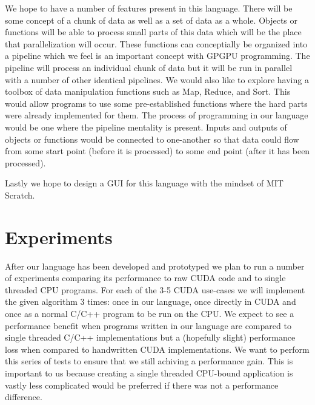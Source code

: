 \documentclass{article}
\begin{document}
We hope to have a number of features present in this language. There will be some concept of a chunk of data as well as a set of data as a whole. Objects or functions will be able to process small parts of this data which will be the place that parallelization will occur. These functions can conceptially be organized into a pipeline which we feel is an important concept with GPGPU programming. The pipeline will process an individual chunk of data but it will be run in parallel with a number of other identical pipelines. We would also like to explore having a toolbox of data manipulation functions such as Map, Reduce, and Sort. This would allow programs to use some pre-established functions where the hard parts were already implemented for them. The process of programming in our language would be one where the pipeline mentality is present. Inputs and outputs of objects or functions would be connected to one-another so that data could flow from some start point (before it is processed) to some end point (after it has been processed).

Lastly we hope to design a GUI for this language with the mindset of MIT Scratch. 

\section{Experiments}
After our language has been developed and prototyped we plan to run a number of experiments comparing its performance to raw CUDA code and to single threaded CPU programs. For each of the 3-5 CUDA use-cases we will implement the given algorithm 3 times: once in our language, once directly in CUDA and once as a normal C/C++ program to be run on the CPU. We expect to see a performance benefit when programs written in our language are compared to single threaded C/C++ implementations but a (hopefully slight) performance loss when compared to handwritten CUDA implementations. We want to perform this series of tests to ensure that we still achiving a performance gain. This is important to us because creating a single threaded CPU-bound application is vastly less complicated would be preferred if there was not a performance difference.
\end{document}
